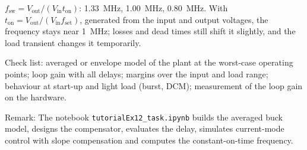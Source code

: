 \begin{solutionblock}
	$f_\mathrm{sw}=V_\mathrm{out}/(V_\mathrm{in}t_\mathrm{on})$: \SI{1.33}{\mega\hertz}, \SI{1.00}{\mega\hertz}, \SI{0.80}{\mega\hertz}. With $t_\mathrm{on}=V_\mathrm{out}/(V_\mathrm{in}f_\mathrm{set})$, generated from the input and output voltages, the frequency stays near \SI{1}{\mega\hertz}; losses and dead times still shift it slightly, and the load transient changes it temporarily.
\end{solutionblock}




\begin{solutionblock}
	Check list: averaged or envelope model of the plant at the worst-case operating points; loop gain with all delays; margins over the input and load range; behaviour at start-up and light load (burst, DCM); measurement of the loop gain on the hardware.
\end{solutionblock}

\vspace{0.5cm}
Remark: The notebook \texttt{tutorialEx12\_task.ipynb} builds the averaged buck model, designs the compensator, evaluates the delay, simulates current-mode control with slope compensation and computes the constant-on-time frequency.
